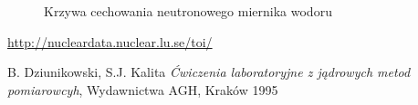 \documentclass{article}
\begin{document}
\begin{figure}[h!]
	\fontsize{6}{8}\selectfont %
	\centering
	\resizebox{1.0\textwidth}{!}{}	
	\caption{Krzywa cechowania neutronowego miernika wodoru}
	\label{krzywa}
\end{figure}


\newpage
\begin{thebibliography}{9}
	
	
	\url{http://nucleardata.nuclear.lu.se/toi/}

	
	B. Dziunikowski, S.J. Kalita
	\emph{Ćwiczenia laboratoryjne z jądrowych metod pomiarowcyh}, Wydawnictwa AGH, Kraków 1995
	
\end{thebibliography}
\vspace{2cm}
\end{document}
